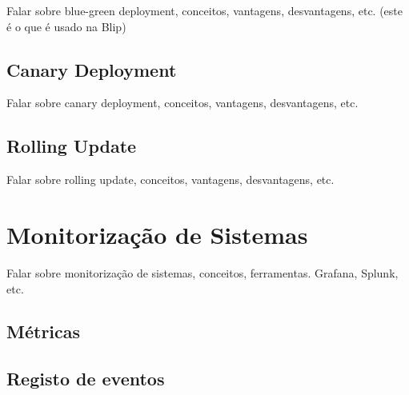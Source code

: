 Falar sobre blue-green deployment, conceitos, vantagens, desvantagens, etc. (este é o que é usado
na Blip)

\subsection{Canary Deployment}

Falar sobre canary deployment, conceitos, vantagens, desvantagens, etc.

\subsection{Rolling Update}

Falar sobre rolling update, conceitos, vantagens, desvantagens, etc.

\section{Monitorização de Sistemas}

Falar sobre monitorização de sistemas, conceitos, ferramentas. Grafana, Splunk, etc.

\subsection{Métricas}

\subsection{Registo de eventos}

